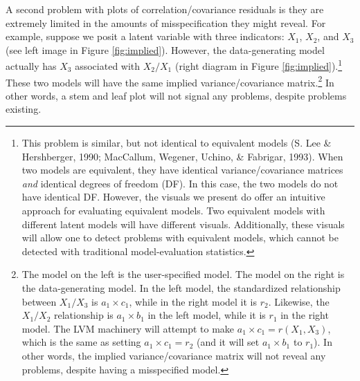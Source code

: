\documentclass[
  english,
  man]{apa6}
\begin{document}
A second problem with plots of correlation/covariance residuals is they are extremely limited in the amounts of misspecification they might reveal. For example, suppose we posit a latent variable with three indicators: \(X_1\), \(X_2\), and \(X_3\) (see left image in Figure \ref{fig:implied}). However, the data-generating model actually has \(X_3\) associated with \(X_2/X_1\) (right diagram in Figure \ref{fig:implied}).\footnote{This problem is similar, but not identical to equivalent models (S. Lee \& Hershberger, 1990; MacCallum, Wegener, Uchino, \& Fabrigar, 1993). When two models are equivalent, they have identical variance/covariance matrices \emph{and} identical degrees of freedom (DF). In this case, the two models do not have identical DF. However, the visuals we present do offer an intuitive approach for evaluating equivalent models. Two equivalent models with different latent models will have different visuals. Additionally, these visuals will allow one to detect problems with equivalent models, which cannot be detected with traditional model-evaluation statistics.} These two models will have the same implied variance/covariance matrix.\footnote{The model on the left is the user-specified model. The model on the right is the data-generating model. In the left model, the standardized relationship between \(X_1/X_3\) is \(a_1\times c_1\), while in the right model it is \(r_2\). Likewise, the \(X_1/X_2\) relationship is \(a_1\times b_1\) in the left model, while it is \(r_1\) in the right model. The LVM machinery will attempt to make \(a_1\times c_1 = r(X_1, X_3)\), which is the same as setting \(a_1\times c_1 = r_2\) (and it will set \(a_1\times b_1\) to \(r_1\)). In other words, the implied variance/covariance matrix will not reveal any problems, despite having a misspecified model.} In other words, a stem and leaf plot will not signal any problems, despite problems existing.
\end{document}
